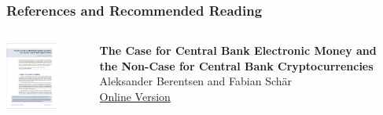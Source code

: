 \documentclass[handout]{beamer}
\begin{document}
\begin{frame}%
\frametitle{References and Recommended Reading}

		\begin{columns}[T]
			\begin{column}{0.1\textwidth}
					\includegraphics[width = 1.7cm, frame]{../assets/images/central_bank_crypto.png}
			\end{column} %
			\begin{column}{0.8\textwidth}
				\textbf{The Case for Central Bank Electronic Money and \\ the Non-Case for Central Bank Cryptocurrencies} \\ 
				Aleksander Berentsen and Fabian Schär \\
				\link \href{https://research.stlouisfed.org/publications/review/2018/02/13/the-case-for-central-bank-electronic-money-and-the-non-case-for-central-bank-cryptocurrencies}{Online Version}
			\end{column}
		\end{columns}
\end{frame}
	
\end{document}
